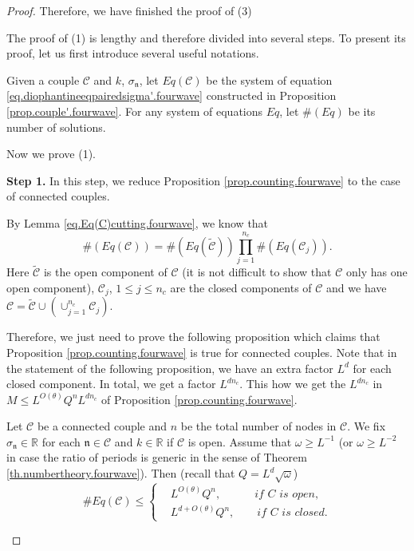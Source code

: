 \begin{proof}
    Therefore, we have finished the proof of (3)
    
    The proof of (1) is lengthy and therefore divided into several steps. To present its proof, let us first introduce several useful notations.
    
    Given a couple $\mathcal{C}$ and $k$, $\sigma_{\mathfrak{n}}$, let $Eq(\mathcal{C})$ be the system of equation \eqref{eq.diophantineeqpairedsigma'.fourwave} constructed in Proposition \ref{prop.couple'.fourwave}. For any system of equations $Eq$, let $\#(Eq)$ be its number of solutions.
    
    Now we prove (1).
    
    \textbf{Step 1.} In this step, we reduce Proposition \ref{prop.counting.fourwave} to the case of connected couples.
    
    By Lemma \eqref{eq.Eq(C)cutting.fourwave}, we know that 
    \begin{equation}\label{eq.conn.fourwave}
     \#(Eq(\mathcal{C}))= \#(Eq(\widetilde{\mathcal{C}}))\prod_{j=1}^{n_c} \#(Eq(\mathcal{C}_{j})).
    \end{equation}
    Here $\widetilde{\mathcal{C}}$ is the open component of $\mathcal{C}$ (it is not difficult to show that $\mathcal{C}$ only has one open component), $\mathcal{C}_{j}$, $1\le j\le n_c$ are the closed components of $\mathcal{C}$ and we have $\mathcal{C}=\widetilde{\mathcal{C}}\cup(\cup_{j=1}^{n_c} \mathcal{C}_{j})$.
    
    Therefore, we just need to prove the following proposition which claims that Proposition \ref{prop.counting.fourwave} is true for connected couples. Note that in the statement of the following proposition, we have an extra factor $L^d$ for each closed component. In total, we get a factor $L^{dn_c}$. This how we get the $L^{dn_c}$ in $M\leq L^{O(\theta)} Q^{n} L^{dn_c}$ of Proposition \ref{prop.counting.fourwave}.
    
    
    \begin{prop}\label{prop.countingconn.fourwave} Let $\mathcal{C}$ be a connected couple and $n$ be the total number of nodes in $\mathcal{C}$. We fix $\sigma_{\mathfrak{n}}\in\mathbb{R}$ for each $\mathfrak{n}\in \mathcal{C}$ and $k\in \mathbb{R}$ if $\mathcal{C}$ is open. Assume that $\omega\ge L^{-1}$ (or $\omega\ge L^{-2}$ in case the ratio of periods is generic in the sense of Theorem \ref{th.numbertheory.fourwave}). Then (recall that $Q=L^{d}\sqrt{\omega}$)
    \begin{equation}\label{eq.countingbd2.fourwave}\# Eq(\mathcal{C})\leq\left\{\begin{aligned}
    &L^{O(\theta)} Q^{n}, \qquad\quad\textit{if $C$ is open},\\
    & L^{d+O(\theta) }Q^{n},\qquad\textit{if $C$ is closed}.
    \end{aligned}
    \right.
    \end{equation}
    \end{prop}
    

\end{proof}
